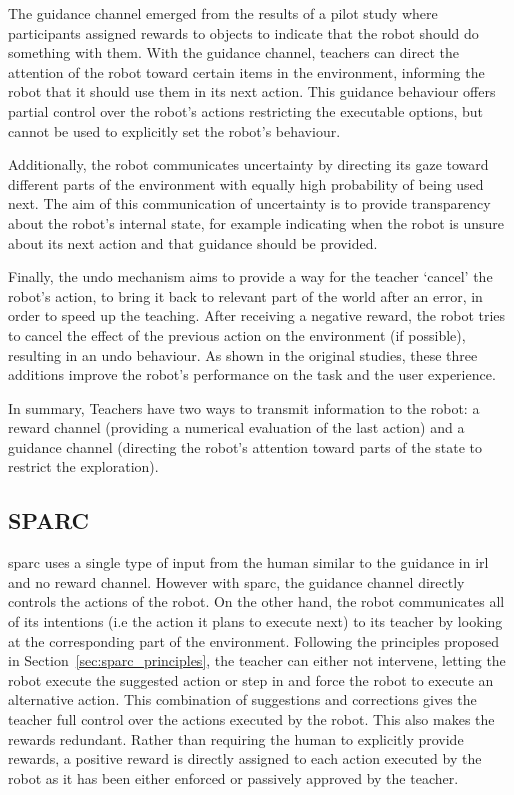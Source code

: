 The guidance channel emerged from the results of a pilot study where participants assigned rewards to objects to indicate that the robot should do something with them. With the guidance channel, teachers can direct the attention of the robot toward certain items in the environment, informing the robot that it should use them in its next action. This guidance behaviour offers partial control over the robot's actions restricting the executable options, but cannot be used to explicitly set the robot's behaviour. 

Additionally, the robot communicates uncertainty by directing its gaze toward different parts of the environment with equally high probability of being used next. The aim of this communication of uncertainty is to provide transparency about the robot's internal state, for example indicating when the robot is unsure about its next action and that guidance should be provided. 

Finally, the undo mechanism aims to provide a way for the teacher `cancel' the robot's action, to bring it back to relevant part of the world after an error, in order to speed up the teaching. After receiving a negative reward, the robot tries to cancel the effect of the previous action on the environment (if possible), resulting in an undo behaviour. As shown in the original studies, these three additions improve the robot's performance on the task and the user experience.

In summary, Teachers have two ways to transmit information to the robot: a reward channel (providing a numerical evaluation of the last action) and a guidance channel (directing the robot's attention toward parts of the state to restrict the exploration).

\subsection{SPARC}

\gls{sparc} uses a single type of input from the human similar to the guidance in \gls{irl} and no reward channel. However with \gls{sparc}, the guidance channel directly controls the actions of the robot. On the other hand, the robot communicates all of its intentions (i.e the action it plans to execute next) to its teacher by looking at the corresponding part of the environment. Following the principles proposed in Section~\ref{sec:sparc_principles}, the teacher can either not intervene, letting the robot execute the suggested action or step in and force the robot to execute an alternative action. This combination of suggestions and corrections gives the teacher full control over the actions executed by the robot. This also makes the rewards redundant. Rather than requiring the human to explicitly provide rewards, a positive reward is directly assigned to each action executed by the robot as it has been either enforced or passively approved by the teacher.

